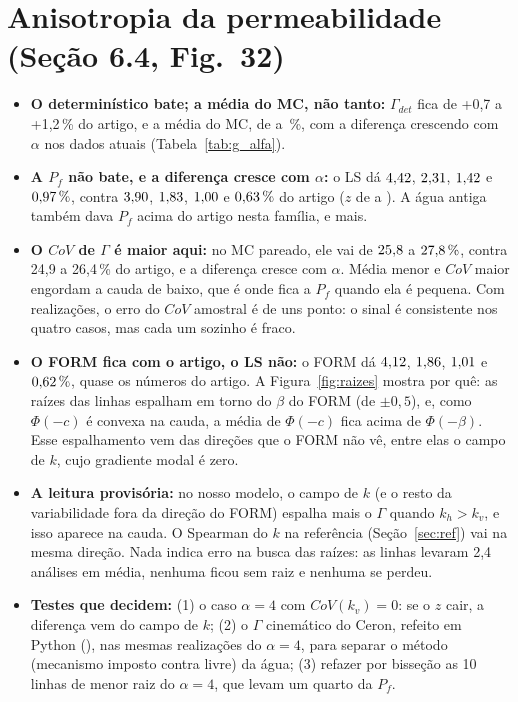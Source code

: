 \documentclass[11pt,a4paper]{article}
\begin{document}
\section{Anisotropia da permeabilidade (Seção 6.4, Fig.~32)}\label{sec:alfa}


\begin{itemize}
  \item \textbf{O determinístico bate; a média do MC, não tanto:} $\Gamma_{det}$ fica de +0,7 a +1,2\,\% do artigo,
    e a média do MC, de \muDifMinAlfa{} a \muDifMaxAlfa\,\%, com a diferença crescendo com $\alpha$ nos dados atuais
    (Tabela~\ref{tab:g_alfa}).
  \item \textbf{A $P_f$ não bate, e a diferença cresce com $\alpha$:} o LS dá $4{,}42$, $2{,}31$,
    $1{,}42$ e $0{,}97\,\%$, contra $3{,}90$, $1{,}83$, $1{,}00$ e $0{,}63\,\%$ do artigo
    ($z$ de \zAlfaII{} a \zAlfaV). A água antiga também dava $P_f$ acima do artigo nesta família, e mais.
  \item \textbf{O $CoV$ de $\Gamma$ é maior aqui:} no MC pareado, ele vai de $25{,}8$ a $27{,}8\,\%$, contra
    24,9 a 26,4\,\% do artigo, e a diferença cresce com $\alpha$. Média menor e $CoV$ maior engordam a cauda de baixo,
    que é onde fica a $P_f$ quando ela é pequena. Com \nMCmin{} realizações, o erro do $CoV$ amostral é de uns
    \cvErroPts{} ponto: o sinal é consistente nos quatro casos, mas cada um sozinho é fraco.
  \item \textbf{O FORM fica com o artigo, o LS não:} o FORM dá $4{,}12$, $1{,}86$, $1{,}01$ e
    $0{,}62\,\%$, quase os números do artigo. A Figura~\ref{fig:raizes} mostra por quê: as raízes das linhas
    espalham em torno do $\beta$ do FORM (de $\pm 0{,}5$), e, como $\Phi(-c)$ é convexa na cauda, a média de
    $\Phi(-c)$ fica acima de $\Phi(-\beta)$. Esse espalhamento vem das direções que o FORM não vê, entre elas o campo
    de $k$, cujo gradiente modal é zero.
  \item \textbf{A leitura provisória:} no nosso modelo, o campo de $k$ (e o resto da variabilidade fora da direção do
    FORM) espalha mais o $\Gamma$ quando $k_h > k_v$, e isso aparece na cauda. O Spearman do $k$ na referência
    (Seção~\ref{sec:ref}) vai na mesma direção. Nada indica erro na busca das raízes: as linhas levaram 2,4 análises
    em média, nenhuma ficou sem raiz e nenhuma se perdeu.
  \item \textbf{Testes que decidem:} (1) o caso $\alpha = 4$ com $CoV(k_v) = 0$: se o $z$ cair, a diferença vem do
    campo de $k$; (2) o $\Gamma$ cinemático do Ceron, refeito em Python (), nas mesmas
    realizações do $\alpha = 4$, para separar o método (mecanismo imposto contra livre) da água; (3) refazer por
    bisseção as 10 linhas de menor raiz do $\alpha = 4$, que levam um quarto da $P_f$.
\end{itemize}
\end{document}

